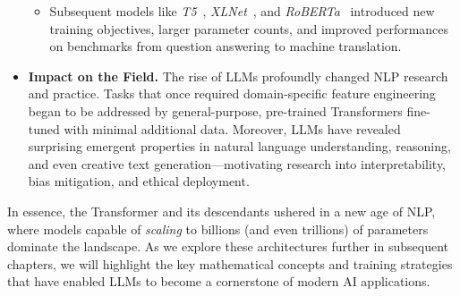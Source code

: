 \begin{itemize}
\begin{itemize}
        \item Subsequent models like \textit{T5}~\cite{raffel2020exploring}, \textit{XLNet}~\cite{yang2019xlnet}, and \textit{RoBERTa}~\cite{liu2019roberta} introduced new training objectives, larger parameter counts, and improved performances on benchmarks from question answering to machine translation.
    \end{itemize}

    \item \textbf{Impact on the Field.}
    The rise of LLMs profoundly changed NLP research and practice. Tasks that once required domain-specific feature engineering began to be addressed by general-purpose, pre-trained Transformers fine-tuned with minimal additional data. Moreover, LLMs have revealed surprising emergent properties in natural language understanding, reasoning, and even creative text generation—motivating research into interpretability, bias mitigation, and ethical deployment.

\end{itemize}

\noindent
In essence, the Transformer and its descendants ushered in a new age of NLP, where models capable of \emph{scaling} to billions (and even trillions) of parameters dominate the landscape. As we explore these architectures further in subsequent chapters, we will highlight the key mathematical concepts and training strategies that have enabled LLMs to become a cornerstone of modern AI applications.
